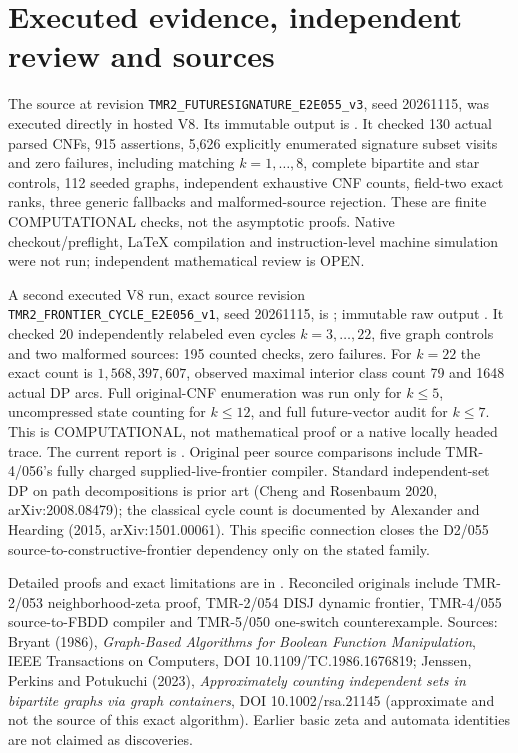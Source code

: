 \documentclass[11pt]{article}
\begin{document}
\section{Executed evidence, independent review and sources}
The source  at revision \texttt{TMR2\_FUTURESIGNATURE\_E2E055\_v3}, seed 20261115, was executed directly in hosted V8. Its immutable output is . It checked 130 actual parsed CNFs, 915 assertions, 5,626 explicitly enumerated signature subset visits and zero failures, including matching $k=1,\ldots,8$, complete bipartite and star controls, 112 seeded graphs, independent exhaustive CNF counts, field-two exact ranks, three generic fallbacks and malformed-source rejection. These are finite COMPUTATIONAL checks, not the asymptotic proofs. Native checkout/preflight, LaTeX compilation and instruction-level machine simulation were not run; independent mathematical review is OPEN.

A second executed V8 run, exact source revision \texttt{TMR2\_FRONTIER\_CYCLE\_E2E056\_v1}, seed 20261115, is ; immutable raw output . It checked 20 independently relabeled even cycles $k=3,\dots,22$, five graph controls and two malformed sources: 195 counted checks, zero failures. For $k=22$ the exact count is $1,568,397,607$, observed maximal interior class count 79 and 1648 actual DP arcs. Full original-CNF enumeration was run only for $k\le5$, uncompressed state counting for $k\le12$, and full future-vector audit for $k\le7$. This is COMPUTATIONAL, not mathematical proof or a native locally headed trace. The current report is . Original peer source comparisons include TMR-4/056's fully charged supplied-live-frontier compiler. Standard independent-set DP on path decompositions is prior art (Cheng and Rosenbaum 2020, arXiv:2008.08479); the classical cycle count is documented by Alexander and Hearding (2015, arXiv:1501.00061). This specific connection closes the D2/055 source-to-constructive-frontier dependency only on the stated family.

Detailed proofs and exact limitations are in . Reconciled originals include TMR-2/053 neighborhood-zeta proof, TMR-2/054 DISJ dynamic frontier, TMR-4/055 source-to-FBDD compiler and TMR-5/050 one-switch counterexample. Sources: Bryant (1986), \emph{Graph-Based Algorithms for Boolean Function Manipulation}, IEEE Transactions on Computers, DOI 10.1109/TC.1986.1676819; Jenssen, Perkins and Potukuchi (2023), \emph{Approximately counting independent sets in bipartite graphs via graph containers}, DOI 10.1002/rsa.21145 (approximate and not the source of this exact algorithm). Earlier basic zeta and automata identities are not claimed as discoveries.
\end{document}
